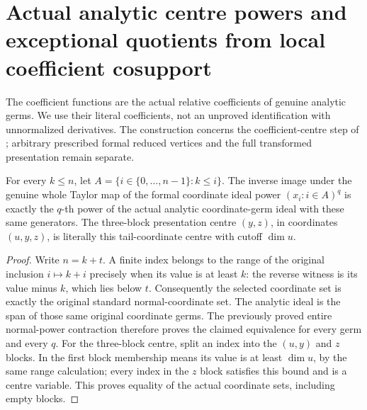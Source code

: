 \section{Actual analytic centre powers and exceptional quotients from local coefficient cosupport}

The coefficient functions are the actual relative coefficients of genuine analytic
germs. We use their literal coefficients, not an unproved identification with
unnormalized derivatives. The construction concerns the coefficient-centre step
of \cite[Theorem 9.4]{bierstone-milman97-invent-math}; arbitrary prescribed formal
reduced vertices and the full transformed presentation remain separate.

\begin{lemma}
\label{hir:actual-analytic-formal-tail-coordinate-power-contraction}
\leanok
For every $k\le n$, let $A=\{i\in\{0,\ldots,n-1\}:k\le i\}$. The inverse
image under the genuine whole Taylor map of the formal coordinate ideal
power $(x_i:i\in A)^q$ is exactly the $q$-th power of the actual analytic
coordinate-germ ideal with these same generators. The three-block
presentation centre $(y,z)$, in coordinates $(u,y,z)$, is literally this
tail-coordinate centre with cutoff $\dim u$.
\end{lemma}
\begin{proof}
Write $n=k+t$. A finite index belongs to the range of the original inclusion
$i\mapsto k+i$ precisely when its value is at least $k$: the reverse witness
is its value minus $k$, which lies below $t$. Consequently the selected
coordinate set is exactly the original standard normal-coordinate set.
The analytic ideal is the span of those same original coordinate germs.
The previously proved entire normal-power contraction therefore proves the
claimed equivalence for every germ and every $q$. For the three-block centre,
split an index into the $(u,y)$ and $z$ blocks. In the first block membership
means its value is at least $\dim u$, by the same range calculation; every
index in the $z$ block satisfies this bound and is a centre variable.
This proves equality of the actual coordinate sets, including empty blocks.
\end{proof}

